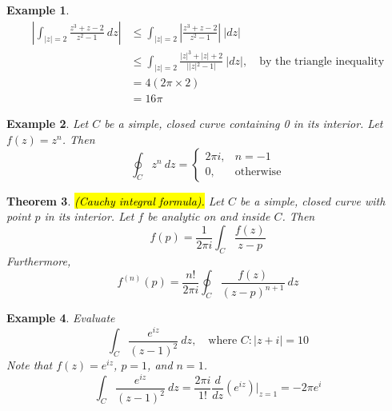 \documentclass{article}
\newtheorem{theorem}{Theorem}[section]
\newtheorem{example}[theorem]{Example}
\theoremstyle{definition}
\begin{document}
\begin{example} \normalfont
    \begin{align*}
        \left| \int_{|z|=2} \frac{z^3+z-2}{z^2-1}\ dz \right| &\leq \int_{|z|=2} \left| \frac{z^3+z-2}{z^2-1} \right|\ |dz| \\
        &\leq \int_{|z|=2} \frac{|z|^3 + |z| + 2}{| |z|^2 - 1 |}\ |dz|,\quad \text{by the triangle inequality} \\
        &= 4(2 \pi \times 2)\\
        &= 16 \pi
    \end{align*}
\end{example}

\begin{example} \normalfont
    Let $C$ be a simple, closed curve containing 0 in its interior. Let $f(z) = z^n$. Then
    \begin{equation*}
        \oint_C z^n\ dz = \begin{cases}
            2 \pi i, & n = -1 \\
            0, & \text{otherwise}
        \end{cases}
    \end{equation*}
\end{example}

\begin{theorem}
    \hl{(Cauchy integral formula).} Let $C$ be a simple, closed curve with point $p$ in its interior. Let $f$ be analytic on and inside $C$. Then
    \begin{equation*}
        f(p) = \frac{1}{2 \pi i} \int_C \frac{f(z)}{z-p}
    \end{equation*}
    Furthermore,
    \begin{equation*}
        f^{(n)}(p) = \frac{n!}{2 \pi i} \oint_C \frac{f(z)}{(z-p)^{n+1}}\ dz
    \end{equation*}
\end{theorem}

\begin{example} \normalfont
    Evaluate
    \begin{equation*}
        \int_C \frac{e^{iz}}{(z-1)^2}\ dz,\quad \text{where $C: |z+i| = 10$}
    \end{equation*}
    Note that $f(z) = e^{iz}$, $p=1$, and $n=1$.
    \begin{equation*}
        \int_C \frac{e^{iz}}{(z-1)^2}\ dz = \frac{2 \pi i}{1!} \frac{d}{dz}(e^{iz}) |_{z=1} = -2 \pi e^i
    \end{equation*}
\end{example}
\end{document}
